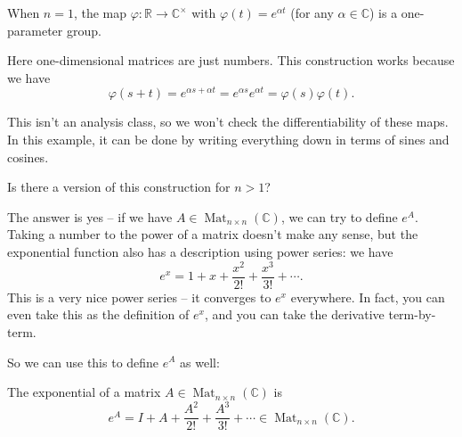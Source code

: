 \begin{example}
When $n = 1$, the map $\varphi : \mathbb{R} \to \mathbb{C}^\times$ with $\varphi(t) = e^{\alpha t}$ (for any $\alpha \in \mathbb{C}$) is a one-parameter group.
\end{example}

Here one-dimensional matrices are just numbers. This construction works because we have \[\varphi(s + t) = e^{\alpha s + \alpha t} = e^{\alpha s}e^{\alpha t} = \varphi(s)\varphi(t).\] 



\begin{note}
This isn't an analysis class, so we won't check the differentiability of these maps. In this example, it can be done by writing everything down in terms of sines and cosines. 
\end{note}

\begin{qq}
Is there a version of this construction for $n > 1$?
\end{qq}

The answer is yes -- if we have $A \in \operatorname{Mat}_{n\times n}(\mathbb{C})$, we can try to define $e^A$. Taking a number to the power of a matrix doesn't make any sense, but the exponential function also has a description using power series: we have \[e^x = 1 + x + \frac{x^2}{2!} + \frac{x^3}{3!} + \cdots.\] This is a very nice power series -- it converges to $e^x$ everywhere. In fact, you can even take this as the definition of $e^x$, and you can take the derivative term-by-term. 

So we can use this to define $e^A$ as well:
\begin{definition}
The exponential of a matrix $A \in \operatorname{Mat}_{n\times n}(\mathbb{C})$ is \[e^A = I + A + \frac{A^2}{2!} + \frac{A^3}{3!} + \cdots \in \operatorname{Mat}_{n \times n}(\mathbb{C}).\] 
\end{definition}

